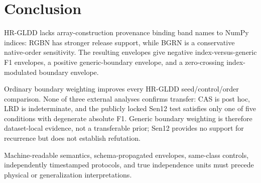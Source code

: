 \section{Conclusion}
\label{sec:conclusion}

HR-GLDD lacks array-construction provenance binding band names to NumPy
indices: RGBN has stronger release support, while BGRN is a conservative
native-order sensitivity. The resulting envelopes give negative
index-versus-generic F1 envelopes, a positive generic-boundary envelope, and a
zero-crossing index-modulated boundary envelope.

Ordinary boundary weighting improves every HR-GLDD seed/control/order comparison. None of three external analyses confirms transfer: CAS is post hoc, LRD is indeterminate, and the publicly locked Sen12 test satisfies only one of five conditions with degenerate absolute F1. Generic boundary weighting is therefore dataset-local evidence, not a transferable prior; Sen12 provides no support for recurrence but does not establish refutation.

Machine-readable semantics, schema-propagated envelopes, same-class controls, independently timestamped protocols, and true independence units must precede physical or generalization interpretations.
